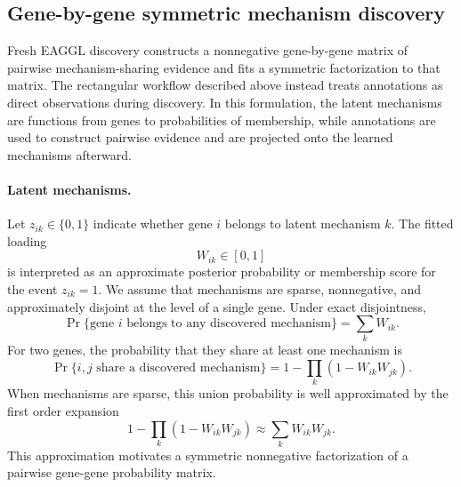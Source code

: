 \documentclass[11pt]{article}
\begin{document}
\subsection{Gene-by-gene symmetric mechanism discovery}
\label{sec:eaggl_gene_gene_symnmf}

Fresh EAGGL discovery constructs a nonnegative gene-by-gene matrix of pairwise
mechanism-sharing evidence and fits a symmetric factorization to that matrix.
The rectangular workflow described above instead treats annotations as direct
observations during discovery. In this formulation, the latent mechanisms are functions from genes to
probabilities of membership, while annotations are used to construct pairwise evidence
and are projected onto the learned mechanisms afterward.

\paragraph{Latent mechanisms.}
Let $z_{ik}\in\{0,1\}$ indicate whether gene $i$ belongs to latent mechanism $k$.
The fitted loading
\[
W_{ik}\in[0,1]
\]
is interpreted as an approximate posterior probability or membership score for the
event $z_{ik}=1$. We assume that mechanisms are sparse, nonnegative, and approximately
disjoint at the level of a single gene. Under exact disjointness,
\begin{equation}
\Pr\{\text{gene } i \text{ belongs to any discovered mechanism}\}
= \sum_k W_{ik}.
\label{eq:eaggl_gene_gene_gene_union}
\end{equation}
For two genes, the probability that they share at least one mechanism is
\begin{equation}
\Pr\{i,j\text{ share a discovered mechanism}\}
= 1 - \prod_k\left(1 - W_{ik} W_{jk}\right).
\label{eq:eaggl_gene_gene_pair_union_exact}
\end{equation}
When mechanisms are sparse, this union probability is well approximated by the first
order expansion
\begin{equation}
1 - \prod_k\left(1 - W_{ik} W_{jk}\right)
\approx \sum_k W_{ik} W_{jk}.
\label{eq:eaggl_gene_gene_pair_union_approx}
\end{equation}
This approximation motivates a symmetric nonnegative factorization of a pairwise
gene-gene probability matrix.
\end{document}
